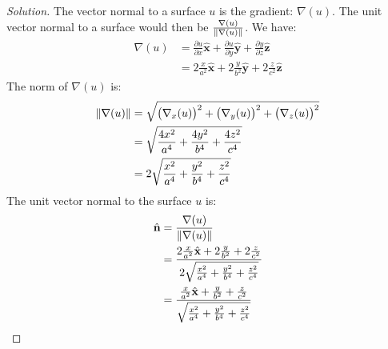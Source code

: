 \documentclass[oneside]{book}
\theoremstyle{mystyle}
\DeclarePairedDelimiter\norm{\lVert}{\rVert}
\begin{document}
\begin{proof}[Solution]
The vector normal to a surface $u$ is the gradient: $\nabla(u)$. The unit vector normal to a surface would then be $\frac{\nabla(u)}{\norm{\nabla(u)}}$. We have:
\begin{align*}
    \nabla(u) &=\frac{\partial u}{\partial x}\hat{\mathbf{x}}+\frac{\partial u}{\partial y}\hat{\mathbf{y}}+\frac{\partial y}{\partial z}\hat{\mathbf{z}}\\
    &= 2\frac{x}{a^2}\hat{\mathbf{x}}+2\frac{y}{b^2}\hat{\mathbf{y}}+2\frac{z}{c^2}\hat{\mathbf{z}}
\end{align*}
The norm of $\nabla(u)$ is:
\begin{align*}
    \norm{\nabla(u)}&=\sqrt{\big(\nabla_{x}(u)\big)^{2}+\big(\nabla_{y}(u)\big)^{2}+\big(\nabla_{z}(u)\big)^{2}}\\
    &=\sqrt{\frac{4x^2}{a^4}+\frac{4y^2}{b^4}+\frac{4z^2}{c^4}}\\
    &=2\sqrt{\frac{x^2}{a^4}+\frac{y^2}{b^4}+\frac{z^2}{c^4}}
\end{align*}
The unit vector normal to the surface $u$ is:
\begin{align*}
    \hat{\mathbf{n}}&=\frac{\nabla(u)}{\norm{\nabla(u)}}\\
    &=\frac{2\frac{x}{a^2}\hat{\mathbf{x}}+2\frac{y}{b^2}+2\frac{z}{c^2}}{2\sqrt{\frac{x^2}{a^4}+\frac{y^2}{b^4}+\frac{z^2}{c^4}}}\\
    &=\frac{\frac{x}{a^2}\hat{\mathbf{x}}+\frac{y}{b^2}+\frac{z}{c^2}}{\sqrt{\frac{x^2}{a^4}+\frac{y^2}{b^4}+\frac{z^2}{c^4}}}\\
\end{align*}
\end{proof}
\end{document}
